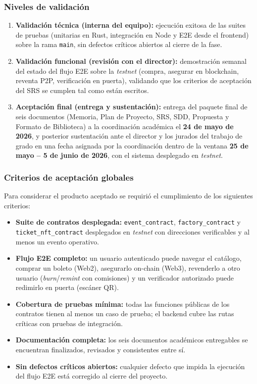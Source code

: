 \documentclass[12pt,oneside]{report}
\begin{document}
      \subsubsection{Niveles de validación}
      \begin{enumerate}
        \item \textbf{Validación técnica (interna del equipo):} ejecución exitosa de las suites de pruebas (unitarias en Rust, integración en Node y E2E desde el frontend) sobre la rama \texttt{main}, sin defectos críticos abiertos al cierre de la fase.
        \item \textbf{Validación funcional (revisión con el director):} demostración semanal del estado del flujo E2E sobre la \textit{testnet} (compra, asegurar en blockchain, reventa P2P, verificación en puerta), validando que los criterios de aceptación del SRS se cumplen tal como están escritos.
        \item \textbf{Aceptación final (entrega y sustentación):} entrega del paquete final de seis documentos (Memoria, Plan de Proyecto, SRS, SDD, Propuesta y Formato de Biblioteca) a la coordinación académica el \textbf{24 de mayo de 2026}, y posterior sustentación ante el director y los jurados del trabajo de grado en una fecha asignada por la coordinación dentro de la ventana \textbf{25 de mayo -- 5 de junio de 2026}, con el sistema desplegado en \textit{testnet}.
      \end{enumerate}

      \subsubsection{Criterios de aceptación globales}
      Para considerar el producto aceptado se requirió el cumplimiento de los siguientes criterios:
      \begin{itemize}
        \item \textbf{Suite de contratos desplegada:} \texttt{event\_contract}, \texttt{factory\_contract} y \texttt{ticket\_nft\_contract} desplegados en \textit{testnet} con direcciones verificables y al menos un evento operativo.
        \item \textbf{Flujo E2E completo:} un usuario autenticado puede navegar el catálogo, comprar un boleto (Web2), asegurarlo on-chain (Web3), revenderlo a otro usuario (\textit{burn}/\textit{remint} con comisiones) y un verificador autorizado puede redimirlo en puerta (escáner QR).
        \item \textbf{Cobertura de pruebas mínima:} todas las funciones públicas de los contratos tienen al menos un caso de prueba; el backend cubre las rutas críticas con pruebas de integración.
        \item \textbf{Documentación completa:} los seis documentos académicos entregables se encuentran finalizados, revisados y consistentes entre sí.
        \item \textbf{Sin defectos críticos abiertos:} cualquier defecto que impida la ejecución del flujo E2E está corregido al cierre del proyecto.
      \end{itemize}
\end{document}
